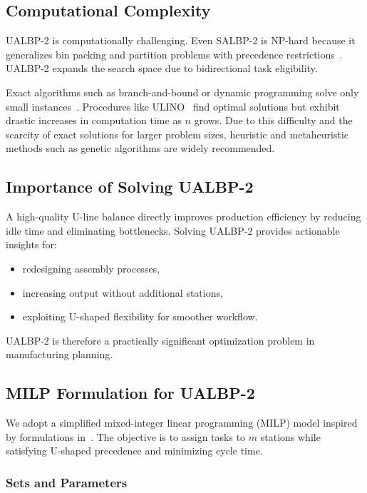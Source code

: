 \documentclass[12pt,a4paper]{article}
\begin{document}
\par
\subsection{Computational Complexity}
UALBP-2 is computationally challenging. Even SALBP-2 is NP-hard because it generalizes
bin packing and partition problems with precedence restrictions~\cite{garey_johnson_1979}. UALBP-2 expands the
search space due to bidirectional task eligibility.

Exact algorithms such as branch-and-bound or dynamic programming solve only small
instances~\cite{scholl_klein_1999}. Procedures like ULINO~\cite{scholl_klein_1999} find optimal solutions but exhibit drastic increases
in computation time as $n$ grows. Due to this difficulty and the scarcity of exact solutions
for larger problem sizes, heuristic and metaheuristic methods such as genetic algorithms are
widely recommended.

\par
\subsection{Importance of Solving UALBP-2}
A high-quality U-line balance directly improves production efficiency by reducing idle time
and eliminating bottlenecks. Solving UALBP-2 provides actionable insights for:
\begin{itemize}
\item redesigning assembly processes,
\item increasing output without additional stations,
\item exploiting U-shaped flexibility for smoother workflow.
\end{itemize}
UALBP-2 is therefore a practically significant optimization problem in manufacturing
planning.

\par
\subsection{MILP Formulation for UALBP-2}
We adopt a simplified mixed-integer linear programming (MILP) model inspired by formulations in~\cite{aase_suresh_2003}. The objective is to assign tasks to $m$ stations while satisfying U-shaped
precedence and minimizing cycle time.

\subsubsection*{Sets and Parameters}
\end{document}
